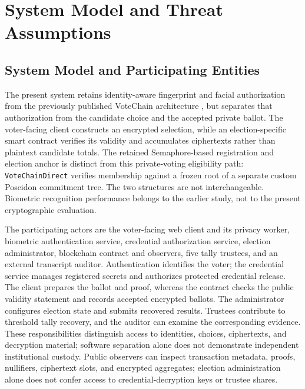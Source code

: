 \section{System Model and Threat Assumptions}
\label{sec:03}
\label{sec:system-model}

\subsection{System Model and Participating Entities}
\label{subsec:system-entities}

The present system retains identity-aware fingerprint and facial authorization from
the previously published VoteChain architecture \citep{rifat2026biometric}, but
separates that authorization from the candidate choice and the accepted private
ballot. The voter-facing client constructs an encrypted selection, while an
election-specific smart contract verifies its validity and accumulates ciphertexts
rather than plaintext candidate totals. The retained Semaphore-based registration
and election anchor is distinct from this private-voting eligibility path:
\texttt{VoteChainDirect} verifies membership against a frozen root of a separate
custom Poseidon commitment tree. The two structures are not interchangeable.
Biometric recognition performance belongs to the earlier study, not to the present
cryptographic evaluation.

The participating actors are the voter-facing web client and its privacy worker,
biometric authentication service, credential authorization service, election
administrator, blockchain contract and observers, five tally trustees, and an
external transcript auditor. Authentication identifies the voter; the credential
service manages registered secrets and authorizes protected credential release. The
client prepares the ballot and proof, whereas the contract checks the public
validity statement and records accepted encrypted ballots. The administrator
configures election state and submits recovered results. Trustees contribute to
threshold tally recovery, and the auditor can examine the corresponding evidence.
These responsibilities distinguish access to identities, choices, ciphertexts, and
decryption material; software separation alone does not demonstrate independent
institutional custody. Public observers can inspect transaction metadata,
proofs, nullifiers, ciphertext slots, and encrypted aggregates; election
administration alone does not confer access to credential-decryption keys or
trustee shares.

